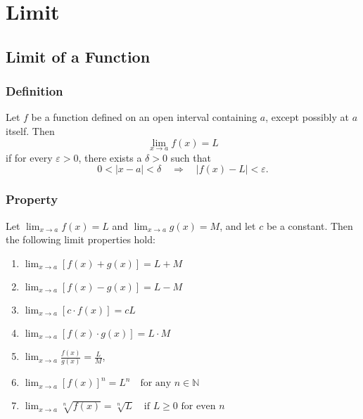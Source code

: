 \documentclass[11pt]{article}
\begin{document}
\pagestyle{plain}
\begin{center}
  \tableofcontents
\end{center}
\newpage
\setcounter{page}{1}
\pagestyle{fancy}

\section{Limit}
\subsection{Limit of a Function}
\subsubsection{Definition}
Let $f$ be a function defined on an open interval containing $a$, except possibly at $a$ itself. 
Then \[\lim_{x\to a}f(x) = L\] if for every $\varepsilon > 0$, there exists a $\delta > 0$ such that
\[
0 < |x - a| < \delta \quad \Rightarrow \quad |f(x) - L| < \varepsilon.
\]
\subsubsection{Property}
Let $\displaystyle\lim_{x \to a} f(x) = L$ and $\displaystyle\lim_{x \to a} g(x) = M$, and let $c$ be a constant. Then the following limit properties hold:
\begin{enumerate}
    \item $ 
        \displaystyle
        \lim_{x \to a} [f(x) + g(x)] = L + M
    $    
    \item $
        \displaystyle
        \lim_{x \to a} [f(x) - g(x)] = L - M
    $
    
    \item $
        \displaystyle
        \lim_{x \to a} [c \cdot f(x)] = cL
    $
    
    \item $
        \displaystyle
        \lim_{x \to a} [f(x) \cdot g(x)] = L \cdot M
    $
    
    \item $
        \displaystyle
        \lim_{x \to a} \frac{f(x)}{g(x)} = \frac{L}{M}
    $, 
    
    \item $
        \displaystyle
        \lim_{x \to a} [f(x)]^n = L^n \quad \text{for any } n \in \mathbb{N}
    $
    
    \item $
        \displaystyle
        \lim_{x \to a} \sqrt[n]{f(x)} = \sqrt[n]{L} \quad \text{if } L \ge 0 \text{ for even } n
    $
\end{enumerate}
\end{document}
